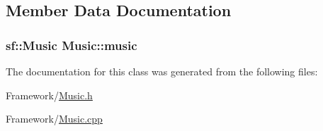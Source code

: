 \subsection{Member Data Documentation}
\subsubsection[{\texorpdfstring{music}{music}}]{\setlength{\rightskip}{0pt plus 5cm}sf\+::\+Music Music\+::music}\hypertarget{classMusic_a5b300a70ca62ec94d0e41c71bc0f9e40}{}\label{classMusic_a5b300a70ca62ec94d0e41c71bc0f9e40}


The documentation for this class was generated from the following files\+:\begin{DoxyCompactItemize}
\item 
Framework/\hyperlink{Music_8h}{Music.\+h}\item 
Framework/\hyperlink{Music_8cpp}{Music.\+cpp}\end{DoxyCompactItemize}
